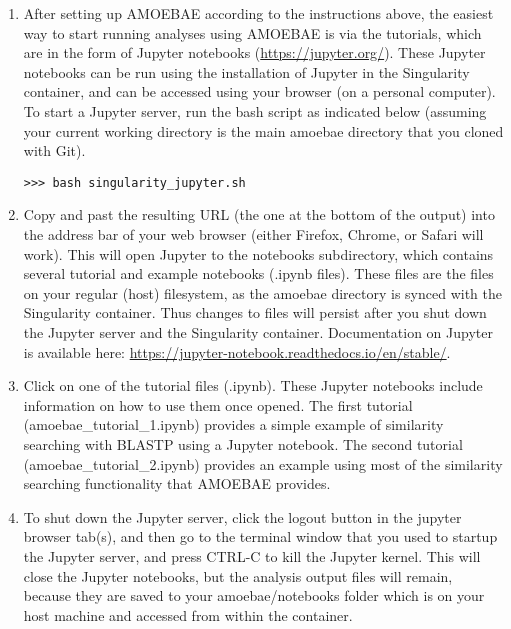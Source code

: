 \documentclass[12pt,letterpaper]{article}
\begin{document}
\begin{linenumbers}
\begin{enumerate}

\item After setting up AMOEBAE according to the instructions above, the easiest
    way to start running analyses using AMOEBAE is via the tutorials, which are in the
        form of Jupyter notebooks (\url{https://jupyter.org/}).  These Jupyter
        notebooks can be run using the installation of Jupyter in the
        Singularity container, and can be accessed using your browser (on a
        personal computer). To start a Jupyter server, run the bash script as
        indicated below (assuming your current working directory is the main
        amoebae directory that you cloned with Git).

\begin{lstlisting}
>>> bash singularity_jupyter.sh
\end{lstlisting}


\item Copy and past the resulting URL (the one at the bottom of the output)
    into the address bar of your web browser (either Firefox, Chrome, or Safari
    will work). This will open Jupyter to the notebooks subdirectory, which
        contains several tutorial and example notebooks (.ipynb files). These
        files are the files on your regular (host) filesystem, as the amoebae
        directory is synced with the Singularity container. Thus changes to
        files will persist after you shut down the Jupyter server and the
        Singularity container. Documentation on Jupyter is available here:
    \url{https://jupyter-notebook.readthedocs.io/en/stable/}. 


\item Click on one of the tutorial files (.ipynb). These Jupyter notebooks
    include information on how to use them once opened. The first tutorial
        (amoebae\_tutorial\_1.ipynb) provides a simple example of similarity
        searching with BLASTP using a Jupyter notebook. The second tutorial
        (amoebae\_tutorial\_2.ipynb) provides an example using most of the
        similarity searching functionality that AMOEBAE provides. 

\item To shut down the Jupyter server, click the logout button in the jupyter
    browser tab(s), and then go to the terminal window that you used to startup
    the Jupyter server, and press CTRL-C to kill the Jupyter kernel. This
    will close the Jupyter notebooks, but the analysis output files will
    remain, because they are saved to your amoebae/notebooks folder which is on
    your host machine and accessed from within the container.



\end{enumerate}
\end{linenumbers}
\end{document}

